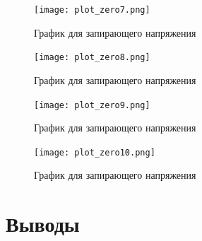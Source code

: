 \documentclass[a4paper, 12pt]{article}
\begin{document}
\begin{figure}[H]
    \centering
    \texttt{[image: plot\_zero7.png]}
    \caption{График для запирающего напряжения}
\end{figure}

\begin{figure}[H]
    \centering
    \texttt{[image: plot\_zero8.png]}
    \caption{График для запирающего напряжения}
\end{figure}

\begin{figure}[H]
    \centering
    \texttt{[image: plot\_zero9.png]}
    \caption{График для запирающего напряжения}
\end{figure}

\begin{figure}[H]
    \centering
    \texttt{[image: plot\_zero10.png]}
    \caption{График для запирающего напряжения}
\end{figure}

\section{Выводы}
\end{document}
